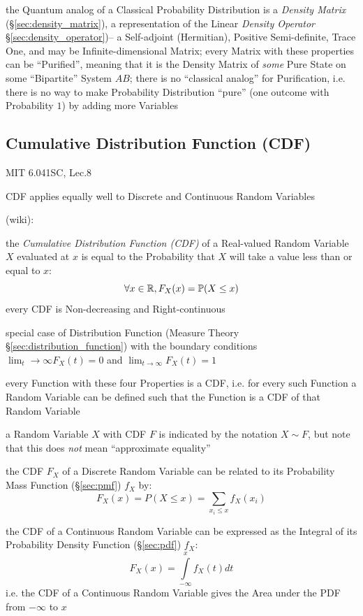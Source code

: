 the Quantum analog of a Classical Probability Distribution is a \emph{Density
  Matrix} (\S\ref{sec:density_matrix}), a representation of the Linear
\emph{Density Operator} \S\ref{sec:density_operator})-- a Self-adjoint
(Hermitian), Positive Semi-definite, Trace One, and may be Infinite-dimensional
Matrix; every Matrix with these properties can be ``Purified'', meaning that it
is the Density Matrix of \emph{some} Pure State on some ``Bipartite'' System
$AB$; there is no ``classical analog'' for Purification, i.e. there is no way to
make Probability Distribution ``pure'' (one outcome with Probability $1$) by
adding more Variables



\subsection{Cumulative Distribution Function (CDF)}\label{sec:cdf}

MIT 6.041SC, Lec.8

CDF applies equally well to Discrete and Continuous Random Variables

(wiki):

the \emph{Cumulative Distribution Function (CDF)} of a Real-valued Random
Variable $X$ evaluated at $x$ is equal to the Probability that $X$ will take a
value less than or equal to $x$:
\[
  \forall x \in \mathbb{R}, F_X(x) = \mathbb{P}(X \leq x)
\]
every CDF is Non-decreasing and Right-continuous

special case of Distribution Function (Measure Theory
\S\ref{sec:distribution_function}) with the boundary conditions
$\lim_t\to\infty F_X(t) = 0$ and $\lim_{t\to\infty}F_X(t) = 1$

every Function with these four Properties is a CDF, i.e. for every such Function
a Random Variable can be defined such that the Function is a CDF of that Random
Variable

a Random Variable $X$ with CDF $F$ is indicated by the notation $X \sim F$, but
note that this does \emph{not} mean ``approximate equality''

the CDF $F_X$ of a Discrete Random Variable can be related to its Probability
Mass Function (\S\ref{sec:pmf}) $f_X$ by:
\[
  F_X(x) = P(X \leq x) = \sum_{x_i \leq x} f_X(x_i)
\]

the CDF of a Continuous Random Variable can be expressed as the Integral of its
Probability Density Function (\S\ref{sec:pdf}) $f_X$:
\[
  F_X(x) = \int\limits_{-\infty}^x f_X(t) dt
\]
i.e. the CDF of a Continuous Random Variable gives the Area under the PDF from
$-\infty$ to $x$

